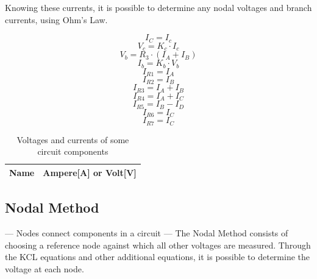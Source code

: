 Knowing these currents, it is possible to determine any nodal voltages and branch currents, using Ohm’s Law.

\begin{equation}
  I_C=I_c
\end{equation}
\begin{equation}
  V_c=K_c\cdot I_c
\end{equation}
\begin{equation}
  V_b=R_3\cdot (I_A+I_B)
\end{equation}
\begin{equation}
  I_b=K_b\cdot V_b
\end{equation}
\begin{equation}
  I_{R1}=I_A
\end{equation}
\begin{equation}
  I_{R2}=I_B
\end{equation}
\begin{equation}
  I_{R3}=I_A+I_B 
\end{equation}
\begin{equation}
  I_{R4}=I_A+I_C
\end{equation}
\begin{equation}
  I_{R5}=I_B - I_D
\end{equation}
\begin{equation}
  I_{R6}=I_C
\end{equation}
\begin{equation}
  I_{R7}=I_C
\end{equation}

\begin{table}[H]
  \centering
  \begin{tabular}{|l|r|}
    \hline    
    {\bf Name} & {\bf Ampere[A] or Volt[V]} \\ \hline
    
  \end{tabular}
  \caption{Voltages and currents of some circuit components}
  \label{tab:valm}
\end{table}
 
\subsection{Nodal Method}

--- Nodes connect components in a circuit ---
The Nodal Method consists of choosing a reference node against which all other voltages are measured. Through the KCL equations and other additional equations, it is possible to determine the voltage at each node.

